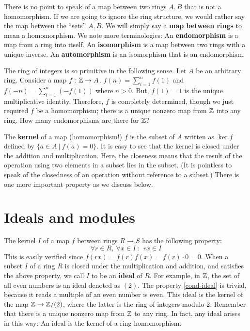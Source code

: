 There is no point to speak of a map between two rings $A,B$ that is not a homomorphism.
If we are going to ignore the ring structure, we would rather say the map between the ``sets'' $A,B$.
We will simply say a {\bf map between rings} to mean a homomorphism.
We note more terminologies: An {\bf endomorphism} is a map from a ring into itself.
An {\bf isomorphism} is a map between two rings with a unique inverse.
An {\bf automorphism} is an isomorphism that is an endomorphism.

The ring of integers is so primitive in the following sense.
Let $A$ be an arbitrary ring. Consider a map $f : \mathbb{Z} \to A$.
$f(n) = \sum_{i=1}^{n} f(1)$ and $f(-n) = \sum_{i=1}^n (-f(1))$ where $n > 0$.
But, $f(1)=1$ is the unique multiplicative identity.
Therefore, $f$ is completely determined, though we just required $f$ be a homomorphism;
there is a unique nonzero map from $\mathbb{Z}$ into any ring.
How many endomorphisms are there for $\mathbb{Z}$?

The {\bf kernel} of a map (homomorphism!) $f$ is the subset of $A$ written as $\ker f$
defined by $\{ a \in A ~|~ f(a) = 0 \}$.
It is easy to see that the kernel is closed under the addition and multiplication.
Here, the closeness means that the result of the operation using two elements in a subset lies in the subset.
(It is pointless to speak of the closedness of an operation without reference to a subset.)
There is one more important property as we discuss below.


\section{Ideals and modules}

The kernel $I$ of a map $f$ between rings $R \to S$ has the following property:
\begin{equation}
 \forall r \in R,~ \forall x \in I~:~~ r x \in I
\label{cond-ideal}
\end{equation}
This is easily verified since $f(r x) = f(r)f(x) = f(r) \cdot 0 = 0$.
When a subset $I$ of a ring $R$ is closed under the multiplication and addition, and satisfies the above property,
we call $I$ to be an {\bf ideal} of $R$.
For example, in $\mathbb{Z}$, the set of all even numbers is an ideal denoted as $(2)$.
The property \eqref{cond-ideal} is trivial, because it reads a multiple of an even number is even.
This ideal is the kernel of the map $\mathbb{Z} \to \mathbb{Z}/(2)$,
where the latter is the ring of integers modulo 2.
Remember that there is a unique nonzero map from $\mathbb{Z}$ to any ring.
In fact, any ideal arises in this way: An ideal is the kernel of a ring homomorphism.

